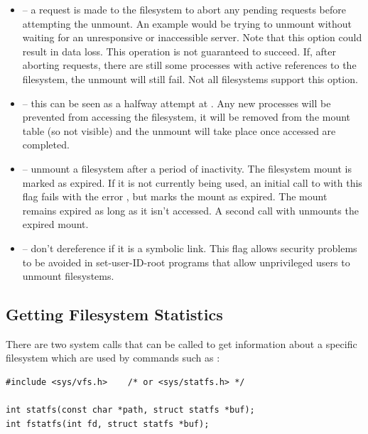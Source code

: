 \begin{itemize}
	\item {} -- a request is made to the filesystem to abort any pending requests before attempting
              the unmount.  An example would be trying to unmount without waiting for an unresponsive or inaccessible server.
              Note that this option could result in data loss. This operation is not guaranteed to succeed. If, after aborting requests, 
              there are still some processes with active references to the filesystem, the unmount will still fail. Not all filesystems
              support this option.
	\item {} -- this can be seen as a halfway attempt at . Any new processes will
		be prevented from accessing the filesystem, it will be removed from the mount table (so not visible) and the
		unmount will take place once accessed are completed.
	\item {} -- unmount a filesystem after a period of inactivity. The filesystem mount is marked as 
		expired.  If it is not currently being used, an initial call to  with this flag fails with the error 
		, but marks the mount as expired.  The mount remains expired as long as it isn't accessed. 
		A second call with  unmounts the expired mount.
	\item {} -- don't dereference  if it is a symbolic link.  This flag allows security 
		problems to be avoided in set-user-ID-root  programs that allow unprivileged users to unmount filesystems.
\end{itemize}


\subsection{Getting Filesystem Statistics}

There are two system calls that can be called to get information about a specific filesystem which are used by commands such as :

\begin{lstlisting}
#include <sys/vfs.h>    /* or <sys/statfs.h> */

int statfs(const char *path, struct statfs *buf);
int fstatfs(int fd, struct statfs *buf);
\end{lstlisting}


